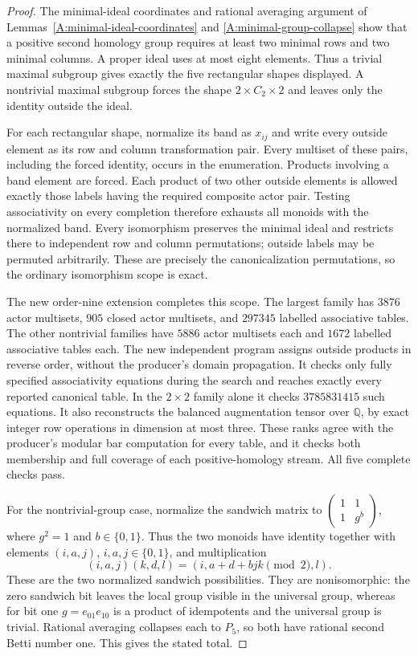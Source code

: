 \begin{proof}
The minimal-ideal coordinates and rational averaging argument
of Lemmas~\ref{A:minimal-ideal-coordinates} and
\ref{A:minimal-group-collapse} show that a positive second
homology group requires at least two minimal rows and two
minimal columns. A proper ideal uses at most eight elements.
Thus a trivial maximal subgroup gives exactly the five
rectangular shapes displayed. A nontrivial maximal subgroup
forces the shape $2\times C_2\times2$ and leaves only the
identity outside the ideal.

For each rectangular shape, normalize its band as
$x_{ij}$ and write every outside element as its row and
column transformation pair. Every multiset of these pairs,
including the forced identity, occurs in the enumeration.
Products involving a band element are forced. Each product
of two other outside elements is allowed exactly those
labels having the required composite actor pair. Testing
associativity on every completion therefore exhausts all
monoids with the normalized band. Every isomorphism preserves
the minimal ideal and restricts there to independent row
and column permutations; outside labels may be permuted
arbitrarily. These are precisely the canonicalization
permutations, so the ordinary isomorphism scope is exact.

The new order-nine extension
 completes this
scope. The largest family has $3876$ actor multisets,
$905$ closed actor multisets, and $297345$ labelled associative
tables. The other nontrivial families have $5886$ actor
multisets each and $1672$ labelled associative tables each.
The new independent program
 assigns outside
products in reverse order, without the producer's domain
propagation. It checks only fully specified associativity
equations during the search and reaches exactly every
reported canonical table. In the $2\times2$ family alone
it checks $3785831415$ such equations. It also reconstructs
the balanced augmentation tensor over $\mathbb Q$, by exact
integer row operations in dimension at most three. These
ranks agree with the producer's modular bar computation
for every table, and it checks both membership and full
coverage of each positive-homology stream. All five
complete checks pass.

For the nontrivial-group case, normalize the sandwich
matrix to
$\left(\begin{smallmatrix}1&1\\1&g^b\end{smallmatrix}\right)$,
where $g^2=1$ and $b\in\{0,1\}$. Thus the two monoids have
identity together with elements $(i,a,j)$,
$i,a,j\in\{0,1\}$, and multiplication
\[
 (i,a,j)(k,d,l)=(i,a+d+bjk\pmod2,l).
\]
These are the two normalized sandwich possibilities. They
are nonisomorphic: the zero sandwich bit leaves the local
group visible in the universal group, whereas for bit one
$g=e_{01}e_{10}$ is a product of idempotents and the
universal group is trivial. Rational averaging collapses
each to $P_5$, so both have rational second Betti number one.
This gives the stated total.
\end{proof}

